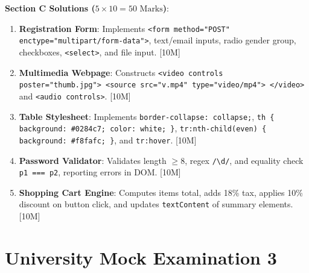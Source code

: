\begin{solutionbox}
\medskip
\noindent\textbf{Section C Solutions ($5 \times 10 = 50\text{ Marks}$)}:
\begin{enumerate}[start=17]
    \item \textbf{Registration Form}: Implements \texttt{<form method="POST" enctype="multipart/form-data">}, text/email inputs, radio gender group, checkboxes, \texttt{<select>}, and file input. [10M]
    \item \textbf{Multimedia Webpage}: Constructs \texttt{<video controls poster="thumb.jpg"> <source src="v.mp4" type="video/mp4"> </video>} and \texttt{<audio controls>}. [10M]
    \item \textbf{Table Stylesheet}: Implements \texttt{border-collapse: collapse;}, \texttt{th \{ background: \#0284c7; color: white; \}}, \texttt{tr:nth-child(even) \{ background: \#f8fafc; \}}, and \texttt{tr:hover}. [10M]
    \item \textbf{Password Validator}: Validates length $\ge 8$, regex \texttt{/\textbackslash d/}, and equality check \texttt{p1 === p2}, reporting errors in DOM. [10M]
    \item \textbf{Shopping Cart Engine}: Computes items total, adds 18\% tax, applies 10\% discount on button click, and updates \texttt{textContent} of summary elements. [10M]
\end{enumerate}
\end{solutionbox}

\section{University Mock Examination 3}

